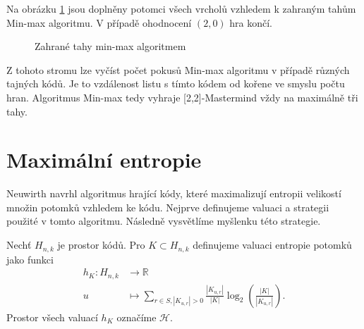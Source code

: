 Na obrázku \ref{fig22minmax} jsou doplněny potomci všech vrcholů vzhledem k zahraným tahům Min-max algoritmu. V případě ohodnocení $(2,0)$ hra končí.
\begin{figure}[h!]
    \centering
    \caption{Zahrané tahy min-max algoritmem}
\label{fig22minmax}
\end{figure}
Z tohoto stromu lze vyčíst počet pokusů Min-max algoritmu v případě různých tajných kódů. Je to vzdálenost listu s tímto kódem od kořene ve smyslu počtu hran. Algoritmus Min-max tedy vyhraje [2,2]-Mastermind vždy na maximálně tři tahy. 
    







\section{Maximální entropie}
Neuwirth \cite{neuwirth} navrhl algoritmus hrající kódy, které maximalizují entropii velikostí množin potomků vzhledem ke kódu. Nejprve definujeme valuaci a strategii použité v tomto algoritmu. Následně vysvětlíme myšlenku této strategie.

\begin{definice}\label{defentropierozdeleni}
    Nechť $H_{n,k}$ je prostor kódů. Pro $K \subset H_{n,k}$ definujeme valuaci entropie potomků jako funkci
    \begin{align*}
        h_K \colon H_{n,k} &\to \mathbb{R} \\
        u &\mapsto \sum_{r\in S, |K_{u,r}| > 0} \frac{|K_{u,r}|}{|K|}\log_2\left( \frac{|K|}{|K_{u,r}|} \right).
    \end{align*}
    Prostor všech valuací $h_K$ označíme $\mathcal{H}$. 
\end{definice}

